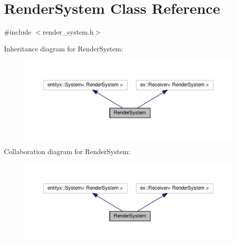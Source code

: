 \hypertarget{classRenderSystem}{}\section{Render\+System Class Reference}
\label{classRenderSystem}


{\ttfamily \#include $<$render\+\_\+system.\+h$>$}



Inheritance diagram for Render\+System\+:
\nopagebreak
\begin{figure}[H]
\begin{center}
\leavevmode
\includegraphics[width=350pt]{classRenderSystem__inherit__graph}
\end{center}
\end{figure}


Collaboration diagram for Render\+System\+:
\nopagebreak
\begin{figure}[H]
\begin{center}
\leavevmode
\includegraphics[width=350pt]{classRenderSystem__coll__graph}
\end{center}
\end{figure}
